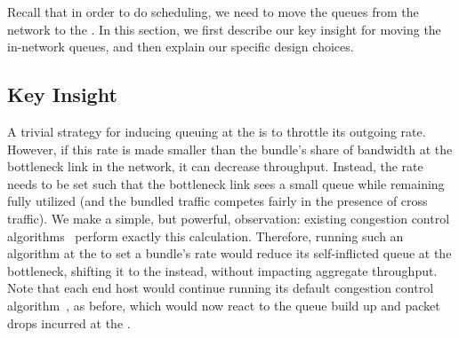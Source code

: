 Recall that in order to do scheduling, we need to move the queues from the network to the \name. 
In this section, we first describe our key insight for moving the in-network queues, and then explain our specific design choices. 

\subsection{Key Insight}


A trivial strategy for inducing queuing at the \name is to throttle its outgoing rate. However, if this rate is made smaller than the bundle's share of bandwidth at the bottleneck link in the network, it can decrease throughput. Instead, the rate needs to be set such that the bottleneck link sees a small queue while remaining fully utilized (and the bundled traffic competes fairly in the presence of cross traffic). We make a simple, but powerful, observation: existing congestion control algorithms~\cite{nimbus, copa} perform exactly this calculation. Therefore, running such an algorithm at the \inbox to set a bundle's rate would reduce its self-inflicted queue at the bottleneck, shifting it to the \inbox instead, without impacting aggregate throughput. Note that each end host would continue running its default congestion control algorithm~\cite{cubic, bbr}, as before, which would now react to the queue build up and packet drops incurred at the \inbox.


